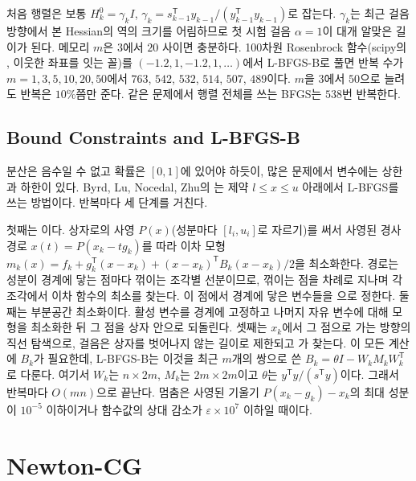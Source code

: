 처음 행렬은 보통 $H_k^0=\gamma_kI$, $\gamma_k=s_{k-1}^{\mathsf T}y_{k-1}/(y_{k-1}^{\mathsf T}y_{k-1})$로 잡는다. $\gamma_k$는 최근 걸음 방향에서 본 Hessian의 역의 크기를 어림하므로 첫 시험 걸음 $\alpha=1$이 대개 알맞은 길이가 된다. 메모리 $m$은 $3$에서 $20$ 사이면 충분하다\cite{liu1989}. 100차원 Rosenbrock 함수(scipy의 , 이웃한 좌표를 잇는 꼴)를 $(-1.2,1,-1.2,1,\dots)$에서 L-BFGS-B로 풀면 반복 수가 $m=1,3,5,10,20,50$에서 $763$, $542$, $532$, $514$, $507$, $489$이다. $m$을 $3$에서 $50$으로 늘려도 반복은 $10\%$쯤만 준다. 같은 문제에서 행렬 전체를 쓰는 BFGS는 $538$번 반복한다.

\subsection{Bound Constraints and L-BFGS-B}

분산은 음수일 수 없고 확률은 $[0,1]$에 있어야 하듯이, 많은 문제에서 변수에는 상한과 하한이 있다. Byrd, Lu, Nocedal, Zhu의 는 제약 $l\le x\le u$ 아래에서 L-BFGS를 쓰는 방법이다\cite{byrd1995lbfgsb,zhu1997lbfgsb}. 반복마다 세 단계를 거친다.

첫째는 이다. 상자로의 사영 $P(x)$(성분마다 $[l_i,u_i]$로 자르기)를 써서 사영된 경사 경로 $x(t)=P(x_k-tg_k)$를 따라 이차 모형 $m_k(x)=f_k+g_k^{\mathsf T}(x-x_k)+(x-x_k)^{\mathsf T}B_k(x-x_k)/2$을 최소화한다. 경로는 성분이 경계에 닿는 점마다 꺾이는 조각별 선분이므로, 꺾이는 점을 차례로 지나며 각 조각에서 이차 함수의 최소를 찾는다. 이 점에서 경계에 닿은 변수들을 으로 정한다. 둘째는 부분공간 최소화이다. 활성 변수를 경계에 고정하고 나머지 자유 변수에 대해 모형을 최소화한 뒤 그 점을 상자 안으로 되돌린다. 셋째는 $x_k$에서 그 점으로 가는 방향의 직선 탐색으로, 걸음은 상자를 벗어나지 않는 길이로 제한되고 가 찾는다. 이 모든 계산에 $B_k$가 필요한데, L-BFGS-B는 이것을 최근 $m$개의 쌍으로 쓴  $B_k=\theta I-W_kM_kW_k^{\mathsf T}$로 다룬다\cite{byrd1994representations}. 여기서 $W_k$는 $n\times2m$, $M_k$는 $2m\times2m$이고 $\theta$는 $y^{\mathsf T}y/(s^{\mathsf T}y)$이다. 그래서 반복마다 $O(mn)$으로 끝난다. 멈춤은 사영된 기울기 $P(x_k-g_k)-x_k$의 최대 성분이 $10^{-5}$ 이하이거나 함수값의 상대 감소가 $\varepsilon\times10^7$ 이하일 때이다.

\section{Newton-CG}
\label{sec:newton-cg}

